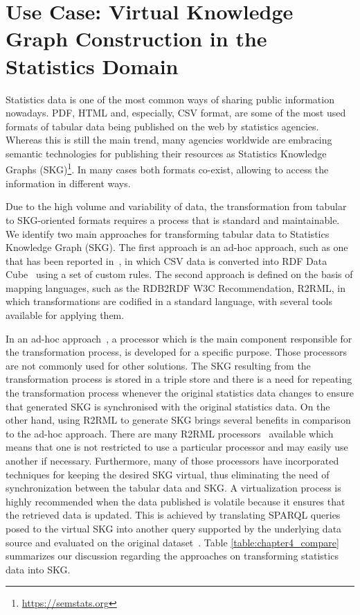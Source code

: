 \section{Use Case: Virtual Knowledge Graph Construction in the Statistics Domain}
\label{sec:chap4_rmlc}

Statistics data is one of the most common ways of sharing public information nowadays. PDF, HTML and, especially, CSV format, are some of the most used formats of tabular data being published on the web by statistics agencies. Whereas this is still the main trend, many agencies worldwide are embracing semantic technologies for publishing their resources as Statistics Knowledge Graphs (SKG)\footnote{\url{https://semstats.org}}. In many cases both formats co-exist, allowing to access the information in different ways. 

Due to the high volume and variability of data, the transformation from tabular to SKG-oriented formats requires a process that is standard and maintainable. We identify two main approaches for transforming tabular data to Statistics Knowledge Graph (SKG). The first approach is an ad-hoc approach, such as one that has been reported in~\citep{corcho2017publishing}, in which CSV data is converted into RDF Data Cube~\citep{cyganiak2012rdf} using a set of custom rules. The second approach is defined on the basis of mapping languages, such as the RDB2RDF W3C Recommendation, R2RML, in which transformations are codified in a standard language, with several tools available for applying them.

In an ad-hoc approach~\citep{corcho2017publishing}, a processor which is the main component responsible for the transformation process, is developed for a specific purpose. Those processors are not commonly used for other solutions. The SKG resulting from the transformation process is stored in a triple store and there is a need for repeating the transformation process whenever the original statistics data changes to ensure that generated SKG is synchronised with the original statistics data. On the other hand, using R2RML to generate SKG brings several benefits in comparison to the ad-hoc approach. There are many R2RML processors~\citep{priyatna2014formalisation,calvanese2017ontop} available which means that one is not restricted to use a particular processor and may easily use another if necessary. Furthermore, many of those processors have incorporated techniques for keeping the desired SKG virtual, thus eliminating the need of synchronization between the tabular data and SKG. A virtualization process is highly recommended when the data published is volatile because it ensures that the retrieved data is updated. This is achieved by translating SPARQL queries posed to the virtual SKG into another query supported by the underlying data source and evaluated on the original dataset~\citep{poggi2008linking}. Table \ref{table:chapter4_compare} summarizes our discussion regarding the approaches on transforming statistics data into SKG.

